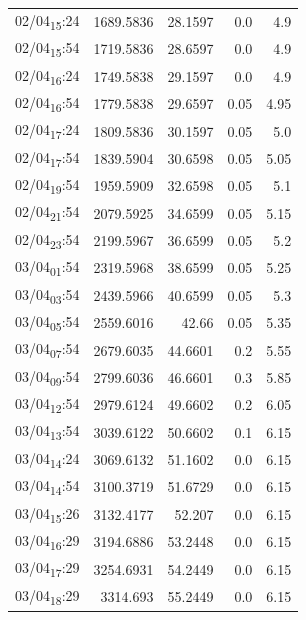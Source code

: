 \documentclass[11pt]{article}
\begin{document}
\begin{center}
\begin{tabular}{lrrrr}
02/04\textsubscript{15}:24 & 1689.5836 & 28.1597 & 0.0 & 4.9\\[0pt]
02/04\textsubscript{15}:54 & 1719.5836 & 28.6597 & 0.0 & 4.9\\[0pt]
02/04\textsubscript{16}:24 & 1749.5838 & 29.1597 & 0.0 & 4.9\\[0pt]
02/04\textsubscript{16}:54 & 1779.5838 & 29.6597 & 0.05 & 4.95\\[0pt]
02/04\textsubscript{17}:24 & 1809.5836 & 30.1597 & 0.05 & 5.0\\[0pt]
02/04\textsubscript{17}:54 & 1839.5904 & 30.6598 & 0.05 & 5.05\\[0pt]
02/04\textsubscript{19}:54 & 1959.5909 & 32.6598 & 0.05 & 5.1\\[0pt]
02/04\textsubscript{21}:54 & 2079.5925 & 34.6599 & 0.05 & 5.15\\[0pt]
02/04\textsubscript{23}:54 & 2199.5967 & 36.6599 & 0.05 & 5.2\\[0pt]
03/04\textsubscript{01}:54 & 2319.5968 & 38.6599 & 0.05 & 5.25\\[0pt]
03/04\textsubscript{03}:54 & 2439.5966 & 40.6599 & 0.05 & 5.3\\[0pt]
03/04\textsubscript{05}:54 & 2559.6016 & 42.66 & 0.05 & 5.35\\[0pt]
03/04\textsubscript{07}:54 & 2679.6035 & 44.6601 & 0.2 & 5.55\\[0pt]
03/04\textsubscript{09}:54 & 2799.6036 & 46.6601 & 0.3 & 5.85\\[0pt]
03/04\textsubscript{12}:54 & 2979.6124 & 49.6602 & 0.2 & 6.05\\[0pt]
03/04\textsubscript{13}:54 & 3039.6122 & 50.6602 & 0.1 & 6.15\\[0pt]
03/04\textsubscript{14}:24 & 3069.6132 & 51.1602 & 0.0 & 6.15\\[0pt]
03/04\textsubscript{14}:54 & 3100.3719 & 51.6729 & 0.0 & 6.15\\[0pt]
03/04\textsubscript{15}:26 & 3132.4177 & 52.207 & 0.0 & 6.15\\[0pt]
03/04\textsubscript{16}:29 & 3194.6886 & 53.2448 & 0.0 & 6.15\\[0pt]
03/04\textsubscript{17}:29 & 3254.6931 & 54.2449 & 0.0 & 6.15\\[0pt]
03/04\textsubscript{18}:29 & 3314.693 & 55.2449 & 0.0 & 6.15\\[0pt]
\end{tabular}
\end{center}
\end{document}
